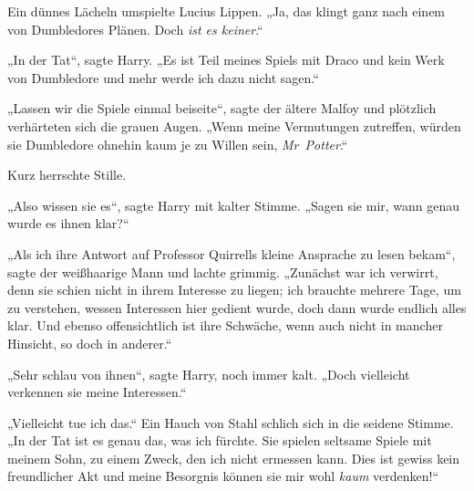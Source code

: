 Ein dünnes Lächeln umspielte Lucius Lippen.
„Ja, das klingt ganz nach einem von Dumbledores Plänen. Doch \emph{ist es keiner}.“

„In der Tat“, sagte Harry.
„Es ist Teil meines Spiels mit Draco und kein Werk von Dumbledore und mehr werde ich dazu nicht sagen.“

„Lassen wir die Spiele einmal beiseite“, sagte der ältere Malfoy und plötzlich verhärteten sich die grauen Augen.
„Wenn meine Vermutungen zutreffen, würden sie Dumbledore ohnehin kaum je zu Willen sein, \emph{Mr~Potter}.“

Kurz herrschte Stille.

„Also wissen sie es“, sagte Harry mit kalter Stimme.
„Sagen sie mir, wann genau wurde es ihnen klar?“

„Als ich ihre Antwort auf Professor Quirrells kleine Ansprache zu lesen bekam“, sagte der weißhaarige Mann und lachte grimmig.
„Zunächst war ich verwirrt, denn sie schien nicht in ihrem Interesse zu liegen; ich brauchte mehrere Tage, um zu verstehen, wessen Interessen hier gedient wurde, doch dann wurde endlich alles klar. Und ebenso offensichtlich ist ihre Schwäche, wenn auch nicht in mancher Hinsicht, so doch in anderer.“

„Sehr schlau von ihnen“, sagte Harry, noch immer kalt.
„Doch vielleicht verkennen sie meine Interessen.“

„Vielleicht tue ich das.“ Ein Hauch von Stahl schlich sich in die seidene Stimme.
„In der Tat ist es genau das, was ich fürchte. Sie spielen seltsame Spiele mit meinem Sohn, zu einem Zweck, den ich nicht ermessen kann. Dies ist gewiss kein freundlicher Akt und meine Besorgnis können sie mir wohl \emph{kaum} verdenken!“

